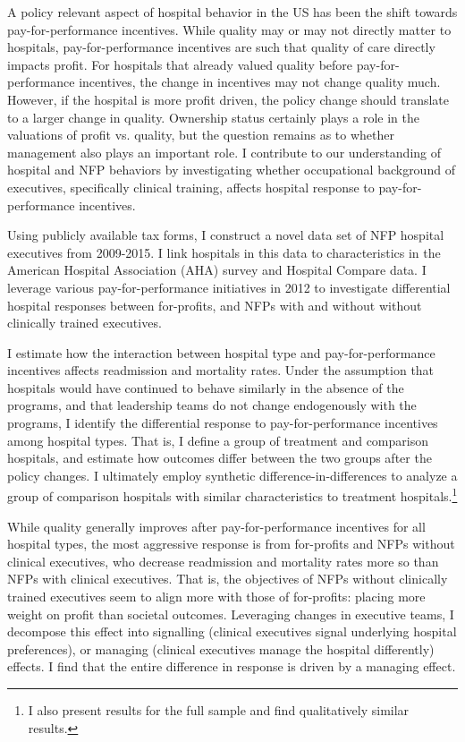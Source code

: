 \documentclass[12pt]{article}
\begin{document}
  A policy relevant aspect of hospital behavior in the US has been the shift towards pay-for-performance incentives. While quality may or may not directly matter to hospitals, pay-for-performance incentives are such that quality of care directly impacts profit. For hospitals that already valued quality before pay-for-performance incentives, the change in incentives may not change quality much. However, if the hospital is more profit driven, the policy change should translate to a larger change in quality. Ownership status certainly plays a role in the valuations of profit vs. quality, but the question remains as to whether management also plays an important role. I contribute to our understanding of hospital and NFP behaviors by investigating whether occupational background of executives, specifically clinical training, affects hospital response to pay-for-performance incentives.

  Using publicly available tax forms, I construct a novel data set of NFP hospital executives from 2009-2015. I link hospitals in this data to characteristics in the American Hospital Association (AHA) survey and Hospital Compare data. I leverage various pay-for-performance initiatives in 2012 to investigate differential hospital responses between for-profits, and NFPs with and without without clinically trained executives. 
  
  I estimate how the interaction between hospital type and pay-for-performance incentives affects readmission and mortality rates. Under the assumption that hospitals would have continued to behave similarly in the absence of the programs, and that leadership teams do not change endogenously with the programs, I identify the differential response to pay-for-performance incentives among hospital types. That is, I define a group of treatment and comparison hospitals, and estimate how outcomes differ between the two groups after the policy changes. I ultimately employ synthetic difference-in-differences to analyze a group of comparison hospitals with similar characteristics to treatment hospitals.\footnote{I also present results for the full sample and find qualitatively similar results.} 
  
   While quality generally improves after pay-for-performance incentives for all hospital types, the most aggressive response is from for-profits and NFPs without clinical executives, who decrease readmission and mortality rates more so than NFPs with clinical executives. That is, the objectives of NFPs without clinically trained executives seem to align more with those of for-profits: placing more weight on profit than societal outcomes. Leveraging changes in executive teams, I decompose this effect into signalling (clinical executives signal underlying hospital preferences), or managing (clinical executives manage the hospital differently) effects. I find that the entire difference in response is driven by a managing effect. 
\end{document}
